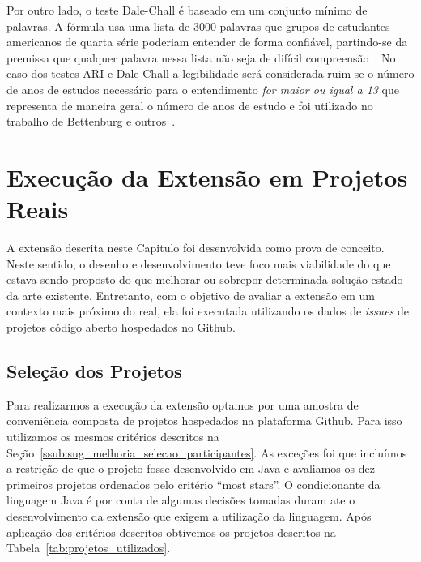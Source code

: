 Por outro lado, o teste Dale-Chall é baseado em um conjunto mínimo de palavras.
A fórmula usa uma lista de 3000 palavras que grupos de estudantes americanos de
quarta série poderiam entender de forma confiável, partindo-se da premissa que
qualquer palavra nessa lista não seja de difícil
compreensão~\cite{dale1948formula}. No caso dos testes ARI e Dale-Chall a
legibilidade será considerada ruim se o número de anos de estudos necessário
para o entendimento \textit{for maior ou igual a 13} que representa de maneira
geral o número de anos de estudo e foi utilizado no trabalho de Bettenburg e
outros~\cite{bettenburg2008makes}.

\section{Execução da Extensão em Projetos Reais}
\label{sec:avaliando_a_extensao_proposta}

A extensão descrita neste Capitulo foi desenvolvida como prova de conceito.
Neste sentido, o desenho e desenvolvimento teve foco mais viabilidade do que
estava sendo proposto do que melhorar ou sobrepor determinada solução estado da
arte existente. Entretanto, com o objetivo de avaliar a extensão em um contexto
mais próximo do real, ela foi executada utilizando os dados de \textit{issues}
de projetos código aberto hospedados no Github.

\subsection{Seleção dos Projetos}
\label{sub:implementacao_selecao_projetos}

Para realizarmos a execução da extensão optamos por uma amostra de conveniência
composta de projetos hospedados na plataforma Github. Para isso utilizamos os
mesmos critérios descritos na
Seção~\ref{ssub:sug_melhoria_selecao_participantes}. As exceções foi que
incluímos a restrição de que o projeto fosse desenvolvido em Java e avaliamos os
dez primeiros projetos ordenados pelo critério ``most stars''. O condicionante
da linguagem Java é por conta de algumas decisões tomadas duram ate o
desenvolvimento da extensão que exigem a utilização da linguagem. Após aplicação
dos critérios descritos obtivemos os projetos descritos na
Tabela~\ref{tab:projetos_utilizados}.

\begin{table}[htpb]
\centering
{}
\caption{Projetos utilizados no testes de execução da extensão. Os dados
    apresentados tem como referência 23/04/2017.}
\label{tab:projetos_utilizados}
\end{table}

